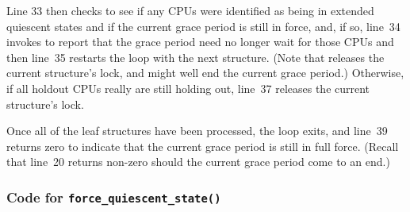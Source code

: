 Line 33 then checks to see if any CPUs were identified as being
in extended quiescent states and if the current grace period is
still in force, and, if so, line~34 invokes 
to report that the grace period need no longer wait for those
CPUs and then line~35 restarts the loop with the next 
structure.
(Note that  releases the current 
structure's lock, and might well end the current grace period.)
Otherwise, if all holdout CPUs really are still holding out, line~37
releases the current  structure's lock.

Once all of the leaf  structures have been processed,
the loop exits, and line~39 returns zero to indicate that the current
grace period is still in full force.
(Recall that line~20 returns non-zero should the current grace period
come to an end.)

\subsubsection{Code for {\tt force\_quiescent\_state()}}
\label{app:rcuimpl:rcutreewt:Code for force-quiescent-state}

